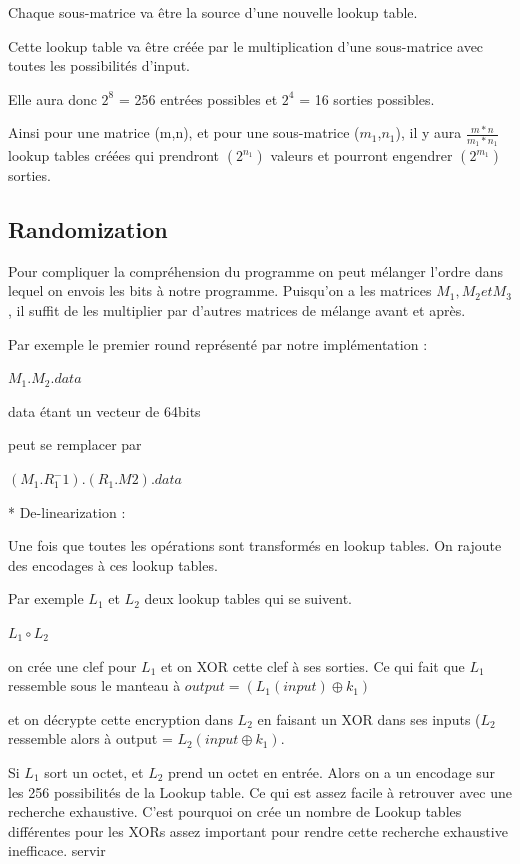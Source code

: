 \documentclass[a4paper,12pt]{article}
\begin{document}
\clearpage

Chaque sous-matrice va être la source d'une nouvelle lookup table.

Cette lookup table va être créée par le multiplication d'une sous-matrice avec toutes les possibilités d'input.

Elle aura donc $2^8$ = 256 entrées possibles et $2^4$ = 16 sorties possibles.

Ainsi pour une matrice (m,n), et pour une sous-matrice ($m_{1}$,$n_{1}$), il y aura     $\frac{m*n}{m_{1}*n_{1}}$ lookup tables créées qui prendront $(2^{n_{1}})$ valeurs et pourront engendrer $(2^{m_{1}})$ sorties.

\subsection{Randomization}

Pour compliquer la compréhension du programme on peut mélanger l'ordre dans lequel on envois les bits à notre programme. Puisqu'on a les matrices $M_1, M_2 et M_3$, il suffit de les multiplier par d'autres matrices de mélange avant et après.

Par exemple le premier round représenté par notre implémentation :

$M_1 . M_2 . data$

data étant un vecteur de 64bits

peut se remplacer par

$(M_1 . R_1^-1) . (R_1 . M2 ) . data$

* De-linearization :

Une fois que toutes les opérations sont transformés en lookup tables. On rajoute des encodages à ces lookup tables.

Par exemple $L_1$ et $L_2$ deux lookup tables qui se suivent.

$L_1 \circ L_2$

on crée une clef pour $L_1$ et on XOR cette clef à ses sorties. Ce qui fait que $L_1$ ressemble sous le manteau à $output = (L_1(input) \oplus k_1)$

et on décrypte cette encryption dans $L_2$ en faisant un XOR dans ses inputs ($L_2$ ressemble alors à output = $L_2(input \oplus k_1).$

Si $L_1$ sort un octet, et $L_2$ prend un octet en entrée. Alors on a un encodage sur les 256 possibilités de la Lookup table. Ce qui est assez facile à retrouver avec une recherche exhaustive. C'est pourquoi on crée un nombre de Lookup tables différentes pour les XORs assez important pour rendre cette recherche exhaustive inefficace. servir
\end{document}
